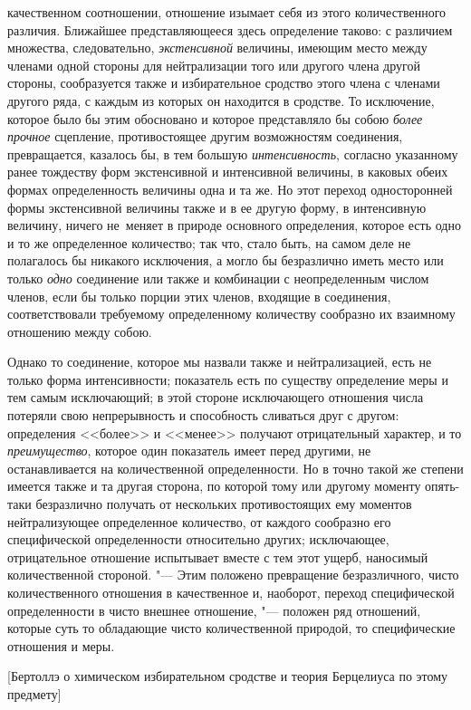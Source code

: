качественном соотношении, отношение изымает себя из этого количественного
различия. Ближайшее представляющееся здесь определение таково: с различием
множества, следовательно, {\em экстенсивной} величины, имеющим место между
членами одной стороны для нейтрализации того или другого члена другой стороны,
сообразуется также и избирательное сродство этого члена с членами другого ряда,
с каждым из которых он находится в сродстве. То исключение, которое было бы
этим обосновано и которое представляло бы собою {\em более прочное} сцепление,
противостоящее другим возможностям соединения, превращается, казалось бы, в тем
большую {\em интенсивность}, согласно указанному ранее тождеству форм
экстенсивной и интенсивной величины, в каковых обеих формах определенность
величины одна и та же. Но этот переход односторонней формы экстенсивной
величины также и в ее другую форму, в интенсивную величину, ничего не~меняет
в природе основного определения, которое есть одно и то же определенное
количество; так что, стало быть, на самом деле не полагалось бы никакого
исключения, а могло бы безразлично иметь место или только {\em одно} соединение
или также и комбинации с неопределенным числом членов, если бы только порции
этих членов, входящие в соединения, соответствовали требуемому определенному
количеству сообразно их взаимному отношению между собою.

Однако то соединение, которое мы назвали также и нейтрализацией, есть не только
форма интенсивности; показатель есть по существу определение меры и тем самым
исключающий; в этой стороне исключающего отношения числа потеряли свою
непрерывность и способность сливаться друг с другом: определения <<более>> и
<<менее>> получают отрицательный характер, и то {\em преимущество}, которое
один показатель имеет перед другими, не останавливается на количественной
определенности. Но в точно такой же степени имеется также и та другая сторона,
по которой тому или другому моменту опять-таки безразлично получать от
нескольких противостоящих ему моментов нейтрализующее определенное количество,
от каждого сообразно его специфической определенности относительно других;
исключающее, отрицательное отношение испытывает вместе с тем этот ущерб,
наносимый количественной стороной. "--- Этим положено превращение
безразличного, чисто количественного отношения в качественное и, наоборот,
переход специфической определенности в чисто внешнее отношение, "--- положен
ряд отношений, которые суть то обладающие чисто количественной природой, то
специфические отношения и меры.

%
{[Бертоллэ о химическом избирательном сродстве и теория Берцелиуса
по этому предмету]}

